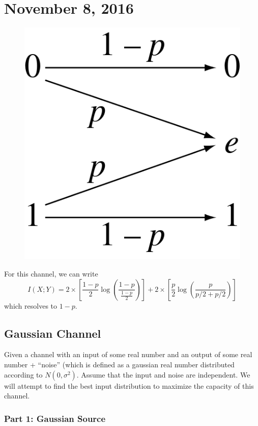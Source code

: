 \documentclass[11pt]{article}
\theoremstyle{definition}
\begin{document}
\section{November 8, 2016}

\begin{figure}[ht]
\centering
\includegraphics[scale=0.2]{binaryerasure}
\end{figure}

For this channel, we can write
$$
I(X; Y) = 2 \times \left[ \frac{1-p}{2} \log \left( \frac{1-p}{\frac{1-p}{2}} \right) \right] + 2 \times \left[ \frac{p}{2} \log \left( \frac{p}{p/2 + p/2} \right) \right]
$$
which resolves to $1-p$. 

\subsection{Gaussian Channel}
Given a channel with an input of some real number and an output of some real number + ``noise'' (which is defined as a gaussian real number distributed according to $N(0, \sigma^2)$. Assume that the input and noise are independent. We will attempt to find the best input distribution to maximize the capacity of this channel. 

\subsubsection{Part 1: Gaussian Source}
\end{document}
